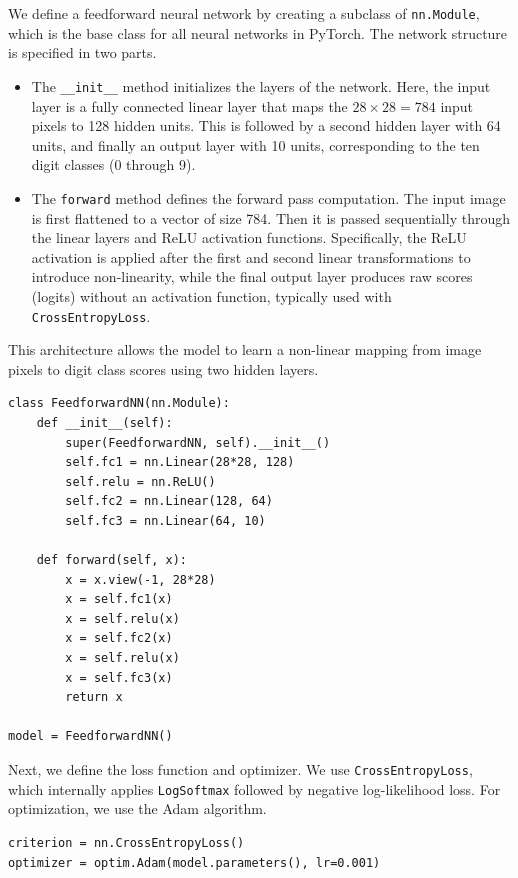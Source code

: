 We define a feedforward neural network by creating a subclass of \texttt{nn.Module}, which is the base class for all neural networks in PyTorch. The network structure is specified in two parts. 
\begin{itemize}
    \item The \texttt{\_\_init\_\_} method initializes the layers of the network. Here, the input layer is a fully connected linear layer that maps the \(28 \times 28 = 784\) input pixels to 128 hidden units. This is followed by a second hidden layer with 64 units, and finally an output layer with 10 units, corresponding to the ten digit classes (0 through 9).
    
    \item The \texttt{forward} method defines the forward pass computation. The input image is first flattened to a vector of size 784. Then it is passed sequentially through the linear layers and ReLU activation functions. Specifically, the ReLU activation is applied after the first and second linear transformations to introduce non-linearity, while the final output layer produces raw scores (logits) without an activation function, typically used with \texttt{CrossEntropyLoss}.
\end{itemize}

This architecture allows the model to learn a non-linear mapping from image pixels to digit class scores using two hidden layers.

\begin{tcolorbox}[codebox]
\begin{verbatim}
class FeedforwardNN(nn.Module):
    def __init__(self):
        super(FeedforwardNN, self).__init__()
        self.fc1 = nn.Linear(28*28, 128)
        self.relu = nn.ReLU()
        self.fc2 = nn.Linear(128, 64)
        self.fc3 = nn.Linear(64, 10)

    def forward(self, x):
        x = x.view(-1, 28*28)
        x = self.fc1(x)
        x = self.relu(x)
        x = self.fc2(x)
        x = self.relu(x)
        x = self.fc3(x)
        return x

model = FeedforwardNN()
\end{verbatim}
\end{tcolorbox}

Next, we define the loss function and optimizer. We use \texttt{CrossEntropyLoss}, which internally applies \texttt{LogSoftmax} followed by negative log-likelihood loss. For optimization, we use the Adam algorithm.

\begin{tcolorbox}[codebox]
\begin{verbatim}
criterion = nn.CrossEntropyLoss()
optimizer = optim.Adam(model.parameters(), lr=0.001)
\end{verbatim}
\end{tcolorbox}

